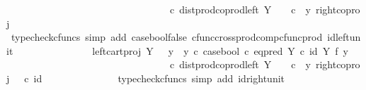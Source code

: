 \begin{isabellebody}
\ \ \ \ \ \ \ \ \ \ \ \ \ \ \ \ \ \ \ \ \ \ \ \ \ \ \ \ \ \ \ \ \ {\isasymcirc}\isactrlsub c\ dist{\isacharunderscore}{\kern0pt}prod{\isacharunderscore}{\kern0pt}coprod{\isacharunderscore}{\kern0pt}left\ Y\ {\isasymone}\ {\isasymone}\ \ {\isasymcirc}\isactrlsub c\ \ {\isasymlangle}y{\isacharcomma}{\kern0pt}\ right{\isacharunderscore}{\kern0pt}coproj\ {\isasymone}\ {\isasymone}{\isasymrangle}{\isachardoublequoteclose}\isanewline
\ \ \ \ \ \ \ \ \ \ \ \ \isamarkupfalse%
\ {\isacharparenleft}{\kern0pt}typecheck{\isacharunderscore}{\kern0pt}cfuncs{\isacharcomma}{\kern0pt}\ simp\ add{\isacharcolon}{\kern0pt}\ case{\isacharunderscore}{\kern0pt}bool{\isacharunderscore}{\kern0pt}false\ cfunc{\isacharunderscore}{\kern0pt}cross{\isacharunderscore}{\kern0pt}prod{\isacharunderscore}{\kern0pt}comp{\isacharunderscore}{\kern0pt}cfunc{\isacharunderscore}{\kern0pt}prod\ id{\isacharunderscore}{\kern0pt}left{\isacharunderscore}{\kern0pt}unit{}{\isacharparenright}{\kern0pt}\isanewline
\ \ \ \ \ \ \ \ \ \ \isamarkupfalse%
\ \isamarkupfalse%
\ {\isachardoublequoteopen}{\isachardot}{\kern0pt}{\isachardot}{\kern0pt}{\isachardot}{\kern0pt}\ {\isacharequal}{\kern0pt}\ {\isacharparenleft}{\kern0pt}left{\isacharunderscore}{\kern0pt}cart{\isacharunderscore}{\kern0pt}proj\ Y\ {\isasymone}\ {\isasymamalg}\ {\isacharparenleft}{\kern0pt}{\isacharparenleft}{\kern0pt}y{}\ {\isasymamalg}\ y{}{\isacharparenright}{\kern0pt}\ {\isasymcirc}\isactrlsub c\ case{\isacharunderscore}{\kern0pt}bool\ {\isasymcirc}\isactrlsub c\ eq{\isacharunderscore}{\kern0pt}pred\ Y\ {\isasymcirc}\isactrlsub c\ {\isacharparenleft}{\kern0pt}id\ Y\ {\isasymtimes}\isactrlsub f\ y{}{\isacharparenright}{\kern0pt}{\isacharparenright}{\kern0pt}{\isacharparenright}{\kern0pt}\isanewline
\ \ \ \ \ \ \ \ \ \ \ \ \ \ \ \ \ \ \ \ \ \ \ \ \ \ \ \ \ \ \ \ \ {\isasymcirc}\isactrlsub c\ dist{\isacharunderscore}{\kern0pt}prod{\isacharunderscore}{\kern0pt}coprod{\isacharunderscore}{\kern0pt}left\ Y\ {\isasymone}\ {\isasymone}\ \ {\isasymcirc}\isactrlsub c\ \ {\isasymlangle}y{\isacharcomma}{\kern0pt}\ right{\isacharunderscore}{\kern0pt}coproj\ {\isasymone}\ {\isasymone}\ {\isasymcirc}\isactrlsub c\ id\ {\isasymone}{\isasymrangle}{\isachardoublequoteclose}\isanewline
\ \ \ \ \ \ \ \ \ \ \ \ \isamarkupfalse%
\ {\isacharparenleft}{\kern0pt}typecheck{\isacharunderscore}{\kern0pt}cfuncs{\isacharcomma}{\kern0pt}\ simp\ add{\isacharcolon}{\kern0pt}\ id{\isacharunderscore}{\kern0pt}right{\isacharunderscore}{\kern0pt}unit{}{\isacharparenright}{\kern0pt}\isanewline

\end{isabellebody}
